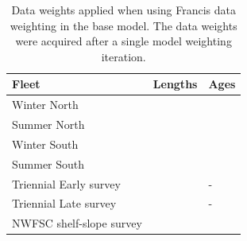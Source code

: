 \documentclass[12pt,]{article}
\begin{document}
\FloatBarrier

\begin{table}[ht]
\centering
\caption{Data weights applied when using Francis data weighting in the base model. The data weights were acquired after a single model weighting iteration.} 
\label{tab:francis}
\begin{tabular}{>{\raggedright}p{2in}>{\centering}p{.7in}>{\centering}p{.7in}}
  \hline
Fleet & Lengths & Ages \\ 
  \hline
Winter North &  &  \\ 
  Summer North &  &  \\ 
  Winter South &  &  \\ 
  Summer South &  &  \\ 
  Triennial Early survey &  & - \\ 
  Triennial Late survey &  & - \\ 
  NWFSC shelf-slope survey &  &  \\ 
   \hline
\end{tabular}
\end{table}

\FloatBarrier 
\end{document}
